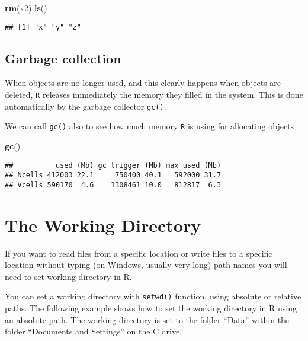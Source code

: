 \documentclass[]{book}
\newenvironment{Shaded}{\begin{snugshade}}{\end{snugshade}}
\newcommand{\KeywordTok}[1]{\textcolor[rgb]{0.13,0.29,0.53}{\textbf{{#1}}}}
\newcommand{\NormalTok}[1]{{#1}}
\begin{document}
\begin{Shaded}
\begin{Highlighting}[]
\KeywordTok{rm}\NormalTok{(x2)}
\KeywordTok{ls}\NormalTok{()}
\end{Highlighting}
\end{Shaded}

\begin{verbatim}
## [1] "x" "y" "z"
\end{verbatim}

\subsection{Garbage collection}\label{garbage-collection}

When objects are no longer used, and this clearly happens when objects
are deleted, \texttt{R} releases immediately the memory they filled in
the system. This is done automatically by the garbage collector
\texttt{gc()}.

We can call \texttt{gc()} also to see how much memory \texttt{R} is
using for allocating objects

\begin{Shaded}
\begin{Highlighting}[]
\KeywordTok{gc}\NormalTok{()}
\end{Highlighting}
\end{Shaded}

\begin{verbatim}
##          used (Mb) gc trigger (Mb) max used (Mb)
## Ncells 412003 22.1     750400 40.1   592000 31.7
## Vcells 590170  4.6    1308461 10.0   812817  6.3
\end{verbatim}

\section{The Working Directory}\label{the-working-directory}

If you want to read files from a specific location or write files to a
specific location without typing (on Windows, usually very long) path
names you will need to set working directory in R.

You can set a working directory with \texttt{setwd()} function, using
absolute or relative paths. The following example shows how to set the
working directory in R using an absolute path. The working directory is
set to the folder ``Data'' within the folder ``Documents and Settings''
on the C drive.
\end{document}

